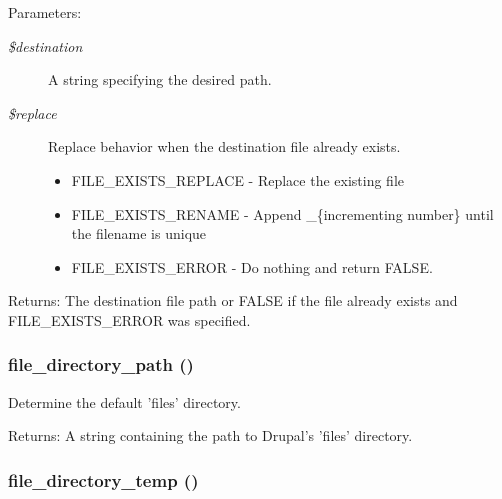 \begin{Desc}
\item[Parameters:]
\begin{description}
\item[{\em \$destination}]A string specifying the desired path. \item[{\em \$replace}]Replace behavior when the destination file already exists.\begin{itemize}
\item FILE\_\-EXISTS\_\-REPLACE - Replace the existing file\item FILE\_\-EXISTS\_\-RENAME - Append \_\-\{incrementing number\} until the filename is unique\item FILE\_\-EXISTS\_\-ERROR - Do nothing and return FALSE. \end{itemize}
\end{description}
\end{Desc}
\begin{Desc}
\item[Returns:]The destination file path or FALSE if the file already exists and FILE\_\-EXISTS\_\-ERROR was specified. \end{Desc}
\hypertarget{group__file_gd516f499a62a2e22f95f4969262cd617}{
\subsubsection[{file\_\-directory\_\-path}]{\setlength{\rightskip}{0pt plus 5cm}file\_\-directory\_\-path ()}}
\label{group__file_gd516f499a62a2e22f95f4969262cd617}


Determine the default 'files' directory.

\begin{Desc}
\item[Returns:]A string containing the path to Drupal's 'files' directory. \end{Desc}
\hypertarget{group__file_g250e5cfba54030ab1e5f031608860e42}{
\subsubsection[{file\_\-directory\_\-temp}]{\setlength{\rightskip}{0pt plus 5cm}file\_\-directory\_\-temp ()}}
\label{group__file_g250e5cfba54030ab1e5f031608860e42}


